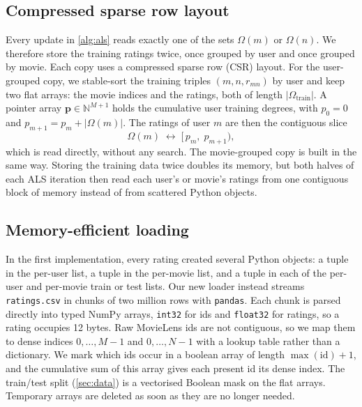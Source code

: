 \documentclass{article}
\theoremstyle{plain}
\theoremstyle{definition}
\theoremstyle{remark}
\begin{document}
\subsection{Compressed sparse row layout}
\label{sec:csr}

Every update in \cref{alg:als} reads exactly one of the sets $\Omega(m)$ or
$\Omega(n)$. We therefore store the training ratings twice, once grouped by
user and once grouped by movie. Each copy uses a compressed sparse row (CSR)
layout. For the user-grouped copy, we stable-sort the training triples
$(m, n, r_{mn})$ by user and keep two flat arrays: the movie indices
and the ratings, both of length $|\Omega_{\text{train}}|$. A pointer array
$\mathbf{p} \in \mathbb{N}^{M+1}$ holds the cumulative user training
degrees, with $p_0 = 0$ and $p_{m+1} = p_m + |\Omega(m)|$. The ratings of
user $m$ are then the contiguous slice
\begin{equation}
  \Omega(m) \;\leftrightarrow\; \big[\, p_m,\; p_{m+1} \big) ,
\end{equation}
which is read directly, without any search. The movie-grouped copy is built
in the same way. Storing the training data twice doubles its memory, but
both halves of each ALS iteration then read each user's or movie's ratings
from one contiguous block of memory instead of from scattered Python
objects.

\subsection{Memory-efficient loading}
\label{sec:loading}

In the first implementation, every rating created several Python objects:
a tuple in the per-user list, a tuple in the per-movie list, and a tuple in
each of the per-user and per-movie train or test lists. Our new loader
instead streams \texttt{ratings.csv} in chunks of two million rows with
\texttt{pandas}. Each chunk is parsed directly into typed NumPy arrays,
\texttt{int32} for ids and \texttt{float32} for ratings, so a rating
occupies 12 bytes. Raw MovieLens ids are not contiguous, so we map them to
dense indices $0, \ldots, M-1$ and $0, \ldots, N-1$ with a lookup table
rather than a dictionary. We mark which ids occur in a boolean array of
length $\max(\text{id}) + 1$, and the cumulative sum of this array gives
each present id its dense index. The train/test split (\cref{sec:data}) is
a vectorised Boolean mask on the flat arrays. Temporary arrays are deleted
as soon as they are no longer needed.
\end{document}
